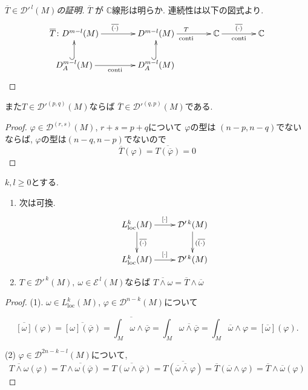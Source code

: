 \begin{proof}[\( \overline{T}\in \mathcal{D}'^{\,l}(M) \)の証明]
 \( \overline{T} \) が \( \mathbb{C} \)線形は明らか. 連続性は以下の図式より. 
\[
\xymatrix@C=4em@R=2em{
\overline{T}\colon
D^{m-l}(M)\ar[r]^{\overline{(\cdot)}}
&
D^{m-l}(M)\ar[r]^{T}_{\text{conti}}
&
\mathbb{C}\ar[r]^{\overline{(\cdot)}}_{\text{conti}}
&
\mathbb{C}
\\
D_A^{m-l}(M)\ar@{^{(}->}[u]\ar[r]_{\text{conti}}
&
D_A^{m-l}(M)\ar@{^{(}->}[u]
}
\]
\end{proof}


また\( T\in \mathcal{D}'^{(p,q)}(M) \)ならば \( \overline{T}\in \mathcal{D}'^{(q,p)}(M) \)である. 

\begin{proof}
\( \varphi\in \mathcal{D}^{(r,s)}(M) \), \( r+s=p+q \)について
$\varphi$の型は \( (n-p,n-q) \)でないならば,  \( \varphi \)の型は\( (n-q,n-p) \)でないので
\[
\overline{T}(\varphi)=\overline{T(\overline{\varphi})}=0
\]
\end{proof}


\begin{tcolorbox}[mybox]
\begin{lem}
\label{lem-M-4.2.2}
 \( k,l\geq 0 \)とする. 

\begin{enumerate}
\item 次は可換.
\[
\xymatrix{
L^k_{\mathrm{loc}}(M) \ar[r]^{[\cdot]} \ar[d]^{\overline{(\cdot)}}
& \mathcal{D}'^{\,k}(M) \ar[d]^{(\overline{(\cdot)}}
\\
L^k_{\mathrm{loc}}(M) \ar[r]^{[\cdot]}
& \mathcal{D}'^{\,k}(M)
}
\]

\item  \( T\in \mathcal{D}'^{\,k}(M),\ \omega\in \mathcal{E}^{\,l}(M) \)ならば
\(\overline{T\wedge \omega}=\overline{T}\wedge \overline{\omega}
\)
\end{enumerate}
\end{lem}
\end{tcolorbox}
\begin{proof}
(1). \( \omega\in L^k_{\mathrm{loc}}(M) \), \( \varphi\in \mathcal{D}^{n-k}(M) \)について

\[
\overline{[\omega]}(\varphi)
=\overline{[\omega](\overline{\varphi})}
=\overline{\int_M \omega\wedge \overline{\varphi}}
=\int_M \overline{\omega\wedge \overline{\varphi}}
=\int_M \overline{\omega}\wedge \varphi
=[\overline{\omega}](\varphi).
\]

(2) \(  \varphi\in \mathcal{D}^{2n-k-l}(M) \)について, 
\[
\overline{T\wedge \omega}(\varphi)
=\overline{T\wedge \omega (\overline{\varphi})}
=\overline{T(\omega\wedge \overline{\varphi})}
=\overline{T(\overline{\overline{\omega}\wedge \varphi})}
=\overline{T}(\overline{\omega}\wedge \varphi)
=\overline{T}\wedge \overline{\omega}(\varphi)
\]
\end{proof}

